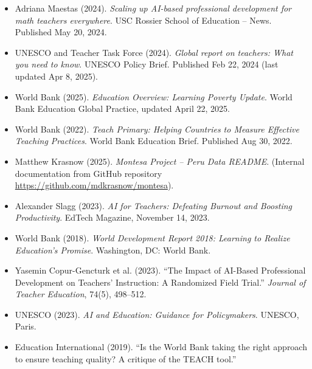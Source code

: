 \documentclass[12pt]{article}
\begin{document}
\begin{itemize}
\item Adriana Maestas (2024). \textit{Scaling up AI-based professional development for math teachers everywhere}. USC Rossier School of Education – News. Published May 20, 2024.
\item UNESCO and Teacher Task Force (2024). \textit{Global report on teachers: What you need to know}. UNESCO Policy Brief. Published Feb 22, 2024 (last updated Apr 8, 2025).
\item World Bank (2025). \textit{Education Overview: Learning Poverty Update}. World Bank Education Global Practice, updated April 22, 2025.
\item World Bank (2022). \textit{Teach Primary: Helping Countries to Measure Effective Teaching Practices}. World Bank Education Brief. Published Aug 30, 2022.
\item Matthew Krasnow (2025). \textit{Montesa Project – Peru Data README}. (Internal documentation from GitHub repository \url{https://github.com/mdkrasnow/montesa}).
\item Alexander Slagg (2023). \textit{AI for Teachers: Defeating Burnout and Boosting Productivity}. EdTech Magazine, November 14, 2023.
\item World Bank (2018). \textit{World Development Report 2018: Learning to Realize Education’s Promise}. Washington, DC: World Bank.
\item Yasemin Copur-Gencturk et al. (2023). “The Impact of AI-Based Professional Development on Teachers’ Instruction: A Randomized Field Trial.” \textit{Journal of Teacher Education}, 74(5), 498–512.
\item UNESCO (2023). \textit{AI and Education: Guidance for Policymakers}. UNESCO, Paris.
\item Education International (2019). “Is the World Bank taking the right approach to ensure teaching quality? A critique of the TEACH tool.”
\end{itemize}
\end{document}

